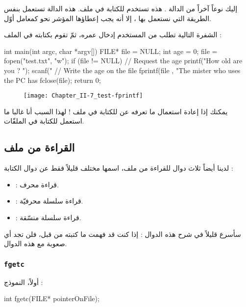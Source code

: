إليك نوعاً آخراً من الدالة
.
هذه تستخدم للكتابة في ملف. هذه الدالة تستعمل بنفس الطريقة التي نستعمل بها
،
إلا أنه يجب إعطاؤها المؤشر نحو
كمعامل أوّل.

الشفرة التالية تطلب من المستخدم إدخال عمره، ثمّ تقوم بكتابته في الملف :

\begin{Csource}
int main(int argc, char *argv[])
{
	FILE* file = NULL;
	int age = 0;
	file = fopen("test.txt", "w");
	if (file != NULL)
	{
    		// Request the age
    		printf("How old are you ? ");
    		scanf("%
    		// Write the age on the file
    		fprintf(file , "The mister who uses the PC has %
    		fclose(file);
	}
 	return 0;
 }
\end{Csource}

\begin{figure}[H]
	\centering
	\texttt{[image: Chapter\_II-7\_test-fprintf]}
\end{figure}

يمكنك إذا إعادة استعمال ما تعرفه عن
للكتابة في ملف ! لهذا السبب أنا غالبا ما استعمل
للكتابة في الملفّات.

\subsection{القراءة من ملف}

لدينا أيضاً ثلاث دوال للقراءة من ملف، اسمها مختلف قليلاً فقط عن دوال الكتابة :

\begin{itemize}
  \item {} :
 قراءة محرف.
  \item {} :
قراءة سلسلة محرفيّة.
  \item {} :
قراءة سلسلة منسّقة.
\end{itemize}

سأسرع قليلاً في شرح هذه الدوال : إذا كنت قد فهمت ما كتبته من قبل، فلن تجد أي صعوبة مع هذه الدوال.

\subsubsection{\texttt{fgetc}}
أولاً، النموذج :

\begin{Csource}
int fgetc(FILE* pointerOnFile);
\end{Csource}


